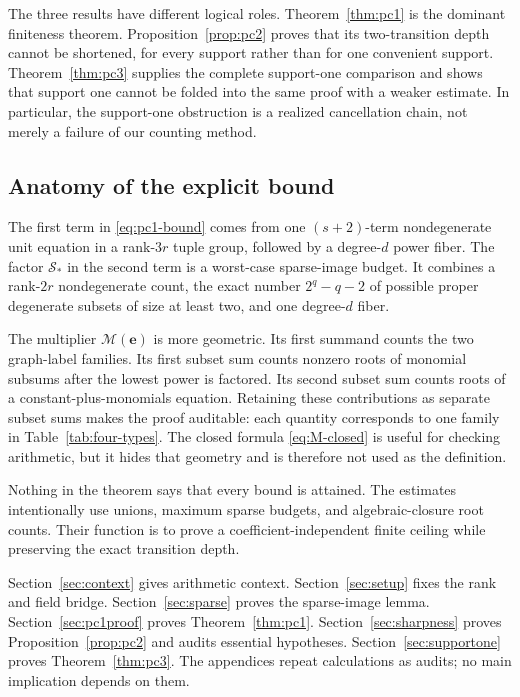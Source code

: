 \documentclass[11pt]{article}
\theoremstyle{definition}
\newcommand{\Scal}{\mathcal S}
\newcommand{\Mcal}{\mathcal M}
\newcommand{\ee}{\mathbf e}
\begin{document}
The three results have different logical roles. Theorem~\ref{thm:pc1} is the dominant finiteness theorem. Proposition~\ref{prop:pc2} proves that its two-transition depth cannot be shortened, for every support rather than for one convenient support. Theorem~\ref{thm:pc3} supplies the complete support-one comparison and shows that support one cannot be folded into the same proof with a weaker estimate. In particular, the support-one obstruction is a realized cancellation chain, not merely a failure of our counting method.

\subsection{Anatomy of the explicit bound}

The first term in \eqref{eq:pc1-bound} comes from one \((s+2)\)-term nondegenerate unit equation in a rank-\(3r\) tuple group, followed by a degree-\(d\) power fiber. The factor \(\Scal_*\) in the second term is a worst-case sparse-image budget. It combines a rank-\(2r\) nondegenerate count, the exact number \(2^q-q-2\) of possible proper degenerate subsets of size at least two, and one degree-\(d\) fiber.

The multiplier \(\Mcal(\ee)\) is more geometric. Its first summand counts the two graph-label families. Its first subset sum counts nonzero roots of monomial subsums after the lowest power is factored. Its second subset sum counts roots of a constant-plus-monomials equation. Retaining these contributions as separate subset sums makes the proof auditable: each quantity corresponds to one family in Table~\ref{tab:four-types}. The closed formula \eqref{eq:M-closed} is useful for checking arithmetic, but it hides that geometry and is therefore not used as the definition.

Nothing in the theorem says that every bound is attained. The estimates intentionally use unions, maximum sparse budgets, and algebraic-closure root counts. Their function is to prove a coefficient-independent finite ceiling while preserving the exact transition depth.

Section~\ref{sec:context} gives arithmetic context. Section~\ref{sec:setup} fixes the rank and field bridge. Section~\ref{sec:sparse} proves the sparse-image lemma. Section~\ref{sec:pc1proof} proves Theorem~\ref{thm:pc1}. Section~\ref{sec:sharpness} proves Proposition~\ref{prop:pc2} and audits essential hypotheses. Section~\ref{sec:supportone} proves Theorem~\ref{thm:pc3}. The appendices repeat calculations as audits; no main implication depends on them.
\end{document}
